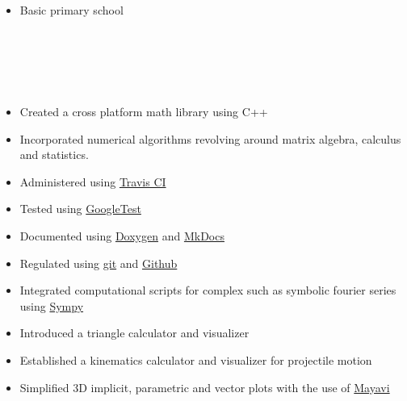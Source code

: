 \documentclass[11pt,a4paper,ragged2e]{altacv}
\begin{document}
\begin{paracol}{2}
\divider
{}
\begin{itemize}
\item Basic primary school
\end{itemize}

 \\
\vspace{0.5mm}
 \\
\vspace{0.5mm}
\divider \\
\\
\vspace{0.5mm}
 \smallskip

\divider
{}




\switchcolumn
\newpage
{}
\begin{itemize}
\item Created a cross platform math library using C++
\item Incorporated numerical algorithms revolving around matrix algebra, calculus and statistics.
\item Administered using \href{https://travis-ci.org/}{Travis CI}
\item Tested using \href{https://github.com/google/googletest}{GoogleTest}
\item Documented using \href{https://www.doxygen.nl/index.html}{Doxygen} and \href{https://www.mkdocs.org/}{MkDocs}
\item Regulated using \href{https://git-scm.com/}{git} and \href{https://github.com/}{Github}
\end{itemize}
\divider

\begin{itemize}
\item Integrated computational scripts for complex such as symbolic fourier series using \href{https://www.sympy.org/en/index.html}{Sympy}
\item Introduced a triangle calculator and visualizer
\item Established a kinematics calculator and visualizer for projectile motion
\item Simplified 3D implicit, parametric and vector plots with the use of \href{https://docs.enthought.com/mayavi/mayavi/}{Mayavi}
\end{itemize}
\divider


\end{paracol}
\end{document}
